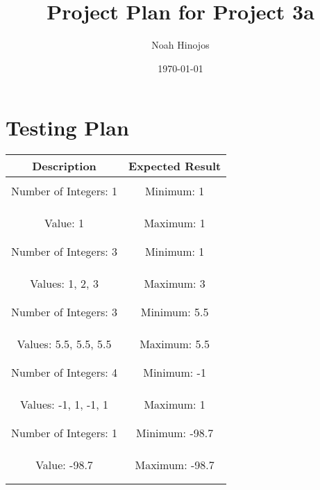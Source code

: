 \documentclass[12pt]{article}
\title{\textbf{Project Plan for Project 3a}}
\author{Noah Hinojos}
\date{\today}
\begin{document}
\maketitle

\section*{Testing Plan}
\renewcommand{\cellalign}{vl}
\begin{tabular}{c|c}
  Description & Expected Result \\
  \hline \\
  \makecell{Number of Integers: 1 \\ \\ Value: 1} & \makecell{Minimum: 1 \\ \\ Maximum: 1} \\ \\
  \hline \\
  \makecell{Number of Integers: 3 \\ \\ Values: 1, 2, 3} & \makecell{Minimum: 1 \\ \\ Maximum: 3} \\ \\
  \hline \\
  \makecell{Number of Integers: 3 \\ \\ Values: 5.5, 5.5, 5.5} & \makecell{Minimum: 5.5\\ \\ Maximum: 5.5} \\ \\
  \hline \\
  \makecell{Number of Integers: 4 \\ \\ Values: -1, 1, -1, 1} & \makecell{Minimum: -1\\ \\ Maximum: 1} \\ \\
  \hline \\
  \makecell{Number of Integers: 1 \\ \\ Value: -98.7} & \makecell{Minimum: -98.7\\ \\ Maximum: -98.7} \\ \\
  \hline \\

\end{tabular}
\end{document}
